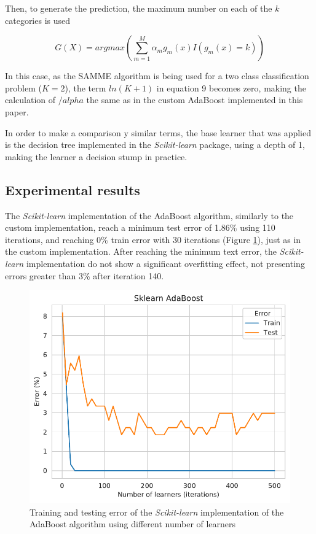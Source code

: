 \documentclass[11pt,twocolumn,letterpaper]{article}
\begin{document}
Then, to generate the prediction, the maximum number on each of the $k$ categories is used

\begin{equation}
	G(X) = argmax(\sum_{m=1}^{M} \alpha_m g_m(x) I(g_m(x) = k))
\end{equation}

In this case, as the SAMME algorithm \cite{Zhu2009} is being used for a two class classification problem ($K = 2$), the term $ln(K+1)$ in equation 9 becomes zero, making the calculation of $/alpha$ the same as in the custom AdaBoost implemented in this paper.

In order to make a comparison y similar terms, the base learner that was applied is the decision tree implemented in the \textit{Scikit-learn} package, using a depth of 1, making the learner a decision stump in practice. 


\subsection{Experimental results}


The \textit{Scikit-learn} implementation of the AdaBoost algorithm, similarly to the custom implementation, reach a minimum test error of 1.86\% using 110 iterations, and reaching 0\% train error with 30 iterations (Figure \ref{fig:nlearners_adaboost_sklearn}), just as in the custom implementation. After reaching the minimum text error, the \textit{Scikit-learn} implementation do not show a significant overfitting effect, not presenting errors greater than 3\% after iteration 140. 

\begin{figure}[h]
	\begin{center}
		\includegraphics[width=1.0\linewidth]{nlearners_adaboost_sklearn.pdf}
		\caption{Training and testing error of the \textit{Scikit-learn} implementation of the AdaBoost algorithm using different number of learners}
		\label{fig:nlearners_adaboost_sklearn}
	\end{center}
\end{figure}
\end{document}
